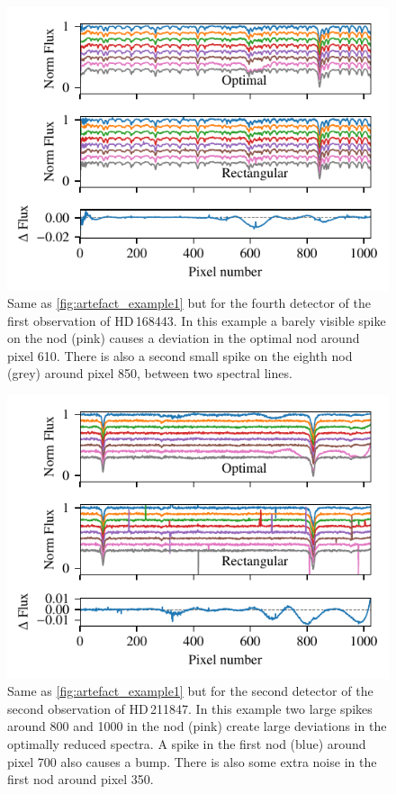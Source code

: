  \begin{figure}
     \centering
     \includegraphics[width=0.7\linewidth]{figures/appendix/bp_plots/extraction_comparision_HD168443-1_chip_4}
     \caption{Same as \cref{fig:artefact_example1} but for the fourth detector of the first observation of {HD\,168443}.
In this example a barely visible spike on the   nod (pink) causes a deviation in the optimal nod around pixel 610.
There is also a second small spike on the eighth nod (grey) around pixel 850, between two spectral lines.}
     \label{fig:artefact_example5}
 \end{figure}
  \begin{figure}
     \centering
     \includegraphics[width=0.7\linewidth]{figures/appendix/bp_plots/extraction_comparision_HD211847-2_chip_2}
     \caption{Same as \cref{fig:artefact_example1} but for the second detector of the second observation of {HD\,211847}.
In this example two large spikes around 800 and 1000 in the  nod (pink) create large deviations in the optimally reduced spectra.
A spike in the first nod (blue) around pixel 700 also causes a bump.
There is also some extra noise in the first nod around pixel 350.}
     \label{fig:artefact_example6}
 \end{figure}
